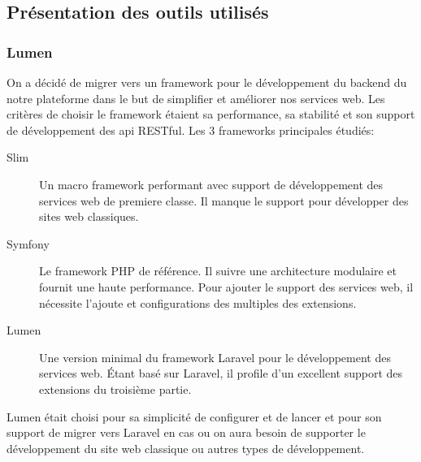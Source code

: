 
\subsection{Présentation des outils utilisés}

\subsubsection{Lumen}

On a décidé de migrer vers un framework pour le développement du backend du
notre plateforme dans le but de simplifier et améliorer nos services web. Les
critères de choisir le framework étaient sa performance, sa stabilité et son
support de développement des api RESTful. Les 3 frameworks principales étudiés:

\begin{description}
    \item [Slim] Un macro framework performant avec support de développement
        des services web de premiere classe. Il manque le support pour
        développer des sites web classiques.
    \item [Symfony] Le framework PHP de référence. Il suivre une architecture
        modulaire et fournit une haute performance. Pour ajouter le support des
        services web, il nécessite l'ajoute et configurations des multiples des
        extensions.
    \item [Lumen] Une version minimal du framework Laravel pour le
        développement des services web. Étant basé sur Laravel, il profile d'un
        excellent support des extensions du troisième partie.
\end{description}

Lumen était choisi pour sa simplicité de configurer et de lancer et pour son
support de migrer vers Laravel en cas ou on aura besoin de supporter le
développement du site web classique ou autres types de développement.



